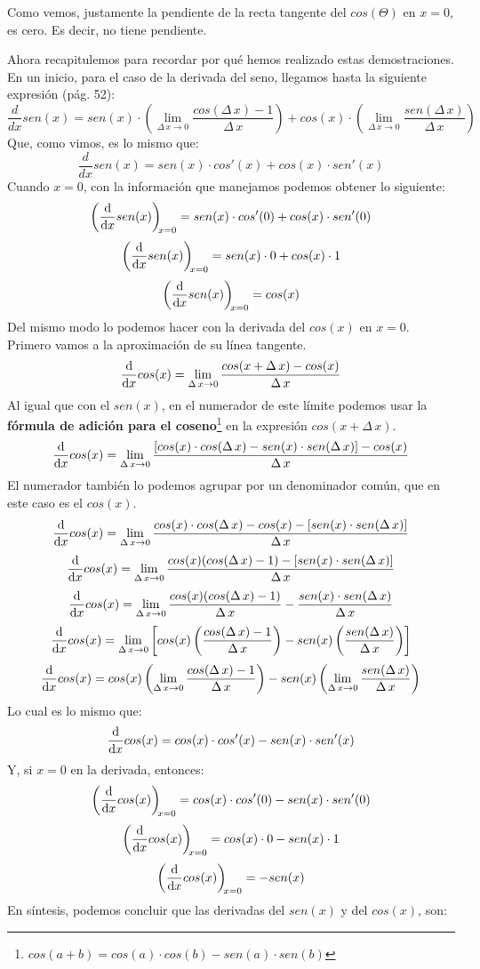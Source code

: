 \documentclass[12pt]{article}
\begin{document}
Como vemos, justamente la pendiente de la recta tangente del $cos(\Theta)$ en $x = 0$, es cero. Es decir, no tiene pendiente.

Ahora recapitulemos para recordar por qué hemos realizado estas demostraciones. En un inicio, para el caso de la derivada del seno, llegamos hasta la siguiente expresión (pág. 52):
\[\frac{d}{dx}sen(x) = sen(x) \cdot \left(\lim_{\Delta \, x \to 0} \frac{cos(\Delta \, x) - 1}{\Delta \, x}\right) + cos(x) \cdot \left(\lim_{\Delta \, x \to 0} \frac{sen(\Delta \, x)}{\Delta \, x}\right)\]
Que, como vimos, es lo mismo que:
\[\frac{d}{dx}sen(x) = sen(x) \cdot cos'(x) + cos(x) \cdot sen'(x)\]
Cuando $x = 0$, con la información que manejamos podemos obtener lo siguiente:
\[\diff*{sen(x)}x[x=0] = sen(x) \cdot cos'(0) + cos(x) \cdot sen'(0)\]
\[\diff*{sen(x)}x[x=0] = sen(x) \cdot 0 + cos(x) \cdot 1\]
\[\diff*{sen(x)}x[x=0] = cos(x)\]
Del mismo modo lo podemos hacer con la derivada del $cos(x)$ en $x = 0$. Primero vamos a la aproximación de su línea tangente.
\[\diff*{cos(x)}x = \lim_{\Delta \, x \to 0} \frac{cos(x + \Delta \, x) - cos(x)}{\Delta \, x}\]
Al igual que con el $sen(x)$, en el numerador de este límite podemos usar la \textbf{fórmula de adición para el coseno}\footnote{$cos(a + b) = cos(a) \cdot cos(b) - sen(a) \cdot sen(b)$} en la expresión $cos(x + \Delta \, x)$.
\[\diff*{cos(x)}x = \lim_{\Delta \, x \to 0} \frac{[cos(x) \cdot cos(\Delta \, x) - sen(x) \cdot sen(\Delta \, x)] - cos(x)}{\Delta \, x}\]
El numerador también lo podemos agrupar por un denominador común, que en este caso es el $cos(x)$.
\[\diff*{cos(x)}x = \lim_{\Delta \, x \to 0} \frac{cos(x) \cdot cos(\Delta \, x) - cos(x) - [sen(x) \cdot sen(\Delta \, x)]}{\Delta \, x}\]
\[\diff*{cos(x)}x = \lim_{\Delta \, x \to 0} \frac{cos(x)(cos(\Delta \, x) - 1) - [sen(x) \cdot sen(\Delta \, x)]}{\Delta \, x}\]
\[\diff*{cos(x)}x = \lim_{\Delta \, x \to 0} \frac{cos(x)(cos(\Delta \, x) - 1)}{\Delta \, x} - \frac{sen(x) \cdot sen(\Delta \, x)}{\Delta \, x}\]
\[\diff*{cos(x)}x = \lim_{\Delta \, x \to 0} \left[cos(x) \left(\frac{cos(\Delta \, x) - 1}{\Delta \, x}\right) - sen(x)\left(\frac{sen(\Delta \, x)}{\Delta \, x}\right)\right]\]
\[\diff*{cos(x)}x = cos(x) \left(\lim_{\Delta \, x \to 0} \frac{cos(\Delta \, x) - 1}{\Delta \, x}\right) - sen(x)\left(\lim_{\Delta \, x \to 0} \frac{sen(\Delta \, x)}{\Delta \, x}\right)\]
Lo cual es lo mismo que:
\[\diff*{cos(x)}x = cos(x) \cdot cos'(x) - sen(x) \cdot sen'(x)\]
Y, si $x = 0$ en la derivada, entonces:
\[\diff*{cos(x)}x[x = 0] = cos(x) \cdot cos'(0) - sen(x) \cdot sen'(0)\]
\[\diff*{cos(x)}x[x = 0] = cos(x) \cdot 0 - sen(x) \cdot 1\]
\[\diff*{cos(x)}x[x = 0] = -sen(x)\]
En síntesis, podemos concluir que las derivadas del $sen(x)$ y del $cos(x)$, son:
\end{document}
